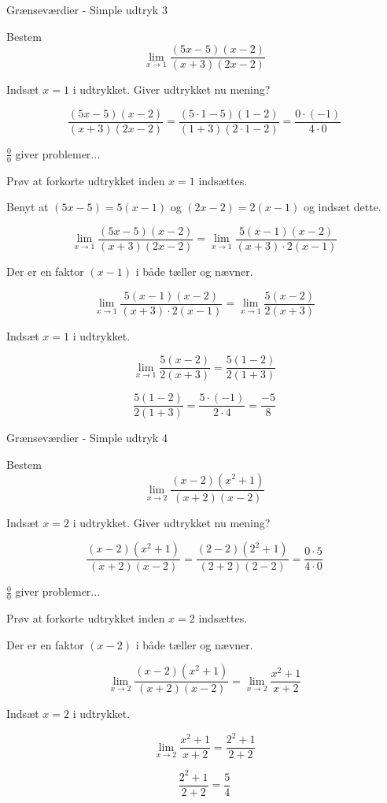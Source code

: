 \documentclass{article}
\begin{document}
\newpage
\begin{exercise}{Grænseværdier - Simple udtryk 3}

Bestem
\[
\lim_{x \to 1} \frac{(5x - 5)(x - 2)}{(x + 3)(2x - 2)}
\]


\hint
Indsæt $x=1$ i udtrykket. Giver udtrykket nu mening?

\hint
\[
\frac{(5x - 5)(x - 2)}{(x + 3)(2x - 2)} = \frac{(5\cdot 1 - 5)(1 - 2)}{(1 + 3)(2 \cdot 1 - 2)} = \frac{0 \cdot (-1)}{4 \cdot 0}
\]

\hint
$\frac{0}{0}$ giver problemer...

\hint
Prøv at forkorte udtrykket inden $x=1$ indsættes.

\hint
Benyt at $(5x - 5) = 5 (x - 1)$ og $(2x - 2) = 2(x - 1)$ og indsæt dette.

\hint
\[
\lim_{x \to 1} \frac{(5x - 5)(x - 2)}{(x + 3)(2x - 2)} = \lim_{x \to 1} \frac{5(x - 1)(x - 2)}{(x + 3) \cdot 2(x - 1)}
\]


\hint
Der er en faktor $(x - 1)$ i både tæller og nævner.

\hint
\[
\lim_{x \to 1} \frac{5(x - 1)(x - 2)}{(x + 3)\cdot 2(x - 1)} = \lim_{x \to 1} \frac{5(x - 2)}{2(x + 3)}
\]

\hint
Indsæt $x=1$ i udtrykket.

\hint
\[
 \lim_{x \to 1} \frac{5(x - 2)}{2(x + 3)} = \frac{5(1 - 2)}{2(1 + 3)}
\]

\hint
\[
\frac{5(1 - 2)}{2(1 + 3)} = \frac{5 \cdot (-1)}{2 \cdot 4} = \frac{-5}{8}
\]


\end{exercise}

\newpage
\begin{exercise}{Grænseværdier - Simple udtryk 4}

Bestem
\[
\lim_{x \to 2} \frac{(x - 2)(x^2 + 1)}{(x + 2)(x - 2)}
\]


\hint
Indsæt $x=2$ i udtrykket. Giver udtrykket nu mening?

\hint
\[
\frac{(x - 2)(x^2 + 1)}{(x + 2)(x - 2)} = \frac{(2 - 2)(2^2 + 1)}{(2 + 2)(2 - 2)} = \frac{0 \cdot 5}{4 \cdot 0}
\]

\hint
$\frac{0}{0}$ giver problemer...

\hint
Prøv at forkorte udtrykket inden $x=2$ indsættes.

\hint
Der er en faktor $(x - 2)$ i både tæller og nævner.

\hint
\[
\lim_{x \to 2} \frac{(x - 2)(x^2 + 1)}{(x + 2)(x - 2)} = \lim_{x \to 2} \frac{x^2 + 1}{x + 2}
\]


\hint
Indsæt $x=2$ i udtrykket.

\hint
\[
\lim_{x \to 2} \frac{x^2 + 1}{x + 2} = \frac{2^2 + 1}{2 + 2}
\]

\hint
\[
\frac{2^2 + 1}{2 + 2} = \frac{5}{4}
\]


\end{exercise}
\end{document}
